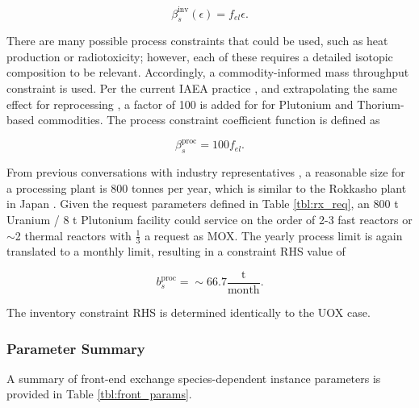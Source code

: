 \begin{equation}
\beta^{\text{inv}}_s(\epsilon) = f_{el} \epsilon. 
\end{equation}

There are many possible process constraints that could be used, such as heat
production or radiotoxicity; however, each of these requires a detailed isotopic
composition to be relevant. Accordingly, a commodity-informed mass throughput
constraint is used. Per the current IAEA practice \cite{heinonen2010}, and
extrapolating the same effect for reprocessing , a factor of 100 is
added for for Plutonium and Thorium-based commodities. The process constraint
coefficient function is defined as

\begin{equation}
\beta^{\text{proc}}_s = 100 f_{el}. 
\end{equation}

From previous conversations with industry representatives \cite{murraycomm}, a
reasonable size for a processing plant is 800 tonnes per year, which is similar
to the Rokkasho plant in Japan \cite{heinonen2010}. Given the request
parameters defined in Table \ref{tbl:rx_req}, an 800 t Uranium / 8 t Plutonium
facility could service on the order of 2-3 fast reactors or $\sim$2 thermal
reactors with $\frac{1}{3}$ a request as MOX. The yearly process limit is again
translated to a monthly limit, resulting in a constraint RHS value of

\begin{equation}
b^{\text{proc}}_s = \sim 66.7 \frac{\text{t}}{\text{month}}.
\end{equation}

The inventory constraint RHS is determined identically to the UOX case.

\subsubsection{Parameter Summary}\label{method:setup:front:sum}

A summary of front-end exchange species-dependent instance parameters is provided
in Table \ref{tbl:front_params}.

